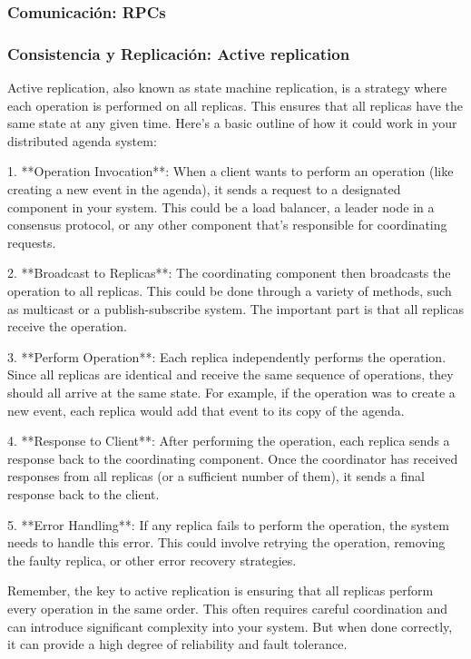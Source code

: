 \documentclass[10pt]{article} %
\begin{document}
	\subsubsection{Comunicaci\'on: RPCs}
	
	\subsubsection{Consistencia y Replicaci\'on: Active replication}
	
	Active replication, also known as state machine replication, is a strategy where each operation is performed on all replicas. This ensures that all replicas have the same state at any given time. Here's a basic outline of how it could work in your distributed agenda system:
	
	1. **Operation Invocation**: When a client wants to perform an operation (like creating a new event in the agenda), it sends a request to a designated component in your system. This could be a load balancer, a leader node in a consensus protocol, or any other component that's responsible for coordinating requests.
	
	2. **Broadcast to Replicas**: The coordinating component then broadcasts the operation to all replicas. This could be done through a variety of methods, such as multicast or a publish-subscribe system. The important part is that all replicas receive the operation.
	
	3. **Perform Operation**: Each replica independently performs the operation. Since all replicas are identical and receive the same sequence of operations, they should all arrive at the same state. For example, if the operation was to create a new event, each replica would add that event to its copy of the agenda.
	
	4. **Response to Client**: After performing the operation, each replica sends a response back to the coordinating component. Once the coordinator has received responses from all replicas (or a sufficient number of them), it sends a final response back to the client.
	
	5. **Error Handling**: If any replica fails to perform the operation, the system needs to handle this error. This could involve retrying the operation, removing the faulty replica, or other error recovery strategies.
	
	Remember, the key to active replication is ensuring that all replicas perform every operation in the same order. This often requires careful coordination and can introduce significant complexity into your system. But when done correctly, it can provide a high degree of reliability and fault tolerance.
	
\end{document}
